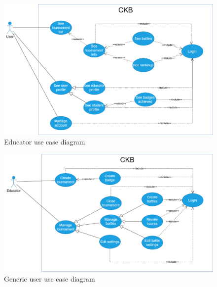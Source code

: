 \vspace{3px}
\begin{figure}[H]
    \centering
    \includegraphics[width=\textwidth]{src/uc_diagrams/educator.png}
    \caption{Educator use case diagram}
\end{figure}

\vspace{3px}
\begin{figure}[H]
    \centering
    \includegraphics[width=\textwidth]{src/uc_diagrams/generic_user.png}
    \caption{Generic user use case diagram}
\end{figure}

\newpage


